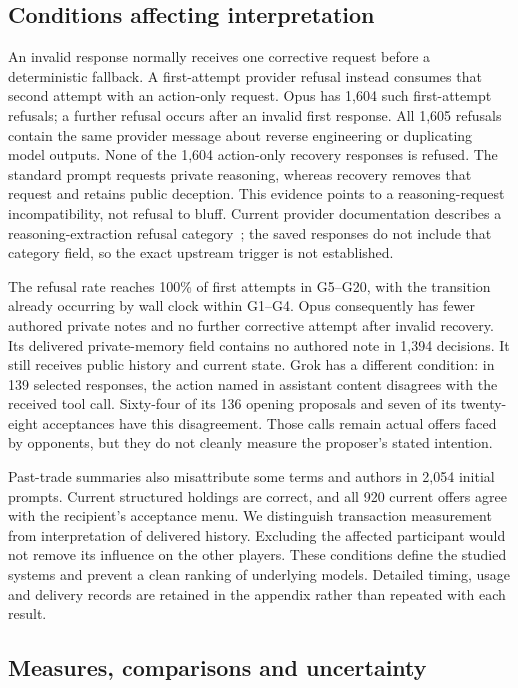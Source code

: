 \subsection{Conditions affecting interpretation}

An invalid response normally receives one corrective request before a deterministic fallback. A first-attempt provider refusal instead consumes that second attempt with an action-only request. Opus has 1,604 such first-attempt refusals; a further refusal occurs after an invalid first response. All 1,605 refusals contain the same provider message about reverse engineering or duplicating model outputs. None of the 1,604 action-only recovery responses is refused. The standard prompt requests private reasoning, whereas recovery removes that request and retains public deception. This evidence points to a reasoning-request incompatibility, not refusal to bluff. Current provider documentation describes a reasoning-extraction refusal category~\cite{anthropic2026reasoning}; the saved responses do not include that category field, so the exact upstream trigger is not established.

The refusal rate reaches 100\% of first attempts in G5--G20, with the transition already occurring by wall clock within G1--G4. Opus consequently has fewer authored private notes and no further corrective attempt after invalid recovery. Its delivered private-memory field contains no authored note in 1,394 decisions. It still receives public history and current state. Grok has a different condition: in 139 selected responses, the action named in assistant content disagrees with the received tool call. Sixty-four of its 136 opening proposals and seven of its twenty-eight acceptances have this disagreement. Those calls remain actual offers faced by opponents, but they do not cleanly measure the proposer's stated intention.

Past-trade summaries also misattribute some terms and authors in 2,054 initial prompts. Current structured holdings are correct, and all 920 current offers agree with the recipient's acceptance menu. We distinguish transaction measurement from interpretation of delivered history. Excluding the affected participant would not remove its influence on the other players. These conditions define the studied systems and prevent a clean ranking of underlying models. Detailed timing, usage and delivery records are retained in the appendix rather than repeated with each result.

\subsection{Measures, comparisons and uncertainty}

